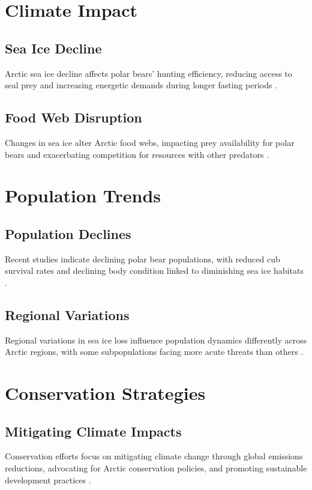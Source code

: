 \documentclass[12pt]{article}
\begin{document}
\section{Climate Impact}
\subsection{Sea Ice Decline}
Arctic sea ice decline affects polar bears' hunting efficiency, reducing access to seal prey and increasing energetic demands during longer fasting periods \citep{serreze2007arctic, obbard2010polar}.

\subsection{Food Web Disruption}
Changes in sea ice alter Arctic food webs, impacting prey availability for polar bears and exacerbating competition for resources with other predators \citep{whiteman2013climate, ramsay2016polar}.

\section{Population Trends}
\subsection{Population Declines}
Recent studies indicate declining polar bear populations, with reduced cub survival rates and declining body condition linked to diminishing sea ice habitats \citep{regehr2007polar, laidre2008quantifying}.

\subsection{Regional Variations}
Regional variations in sea ice loss influence population dynamics differently across Arctic regions, with some subpopulations facing more acute threats than others \citep{obbard2016polar, wiig2015polar}.

\section{Conservation Strategies}
\subsection{Mitigating Climate Impacts}
Conservation efforts focus on mitigating climate change through global emissions reductions, advocating for Arctic conservation policies, and promoting sustainable development practices \citep{durner2009predicting, amstrup2010future}.
\end{document}

